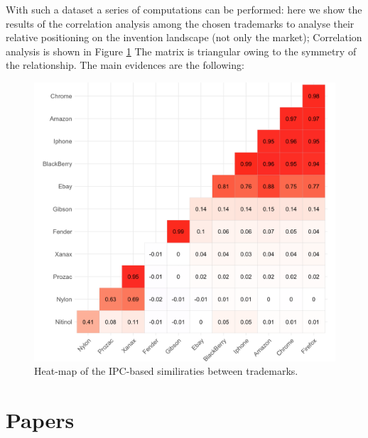 \documentclass[]{book}
\begin{document}
With such a dataset a series of computations can be performed: here we
show the results of the correlation analysis among the chosen trademarks
to analyse their relative positioning on the invention landscape (not
only the market); Correlation analysis is shown in Figure
\ref{fig:similartm} The matrix is triangular owing to the symmetry of
the relationship. The main evidences are the following:

\begin{figure}

{\centering \includegraphics[width=1\linewidth]{_bookdown_files/figures/correlation_matrix_tm} 

}

\caption{Heat-map of the IPC-based similiraties between trademarks.}\label{fig:similartm}
\end{figure}

\chapter{Papers}\label{papers}
\end{document}
